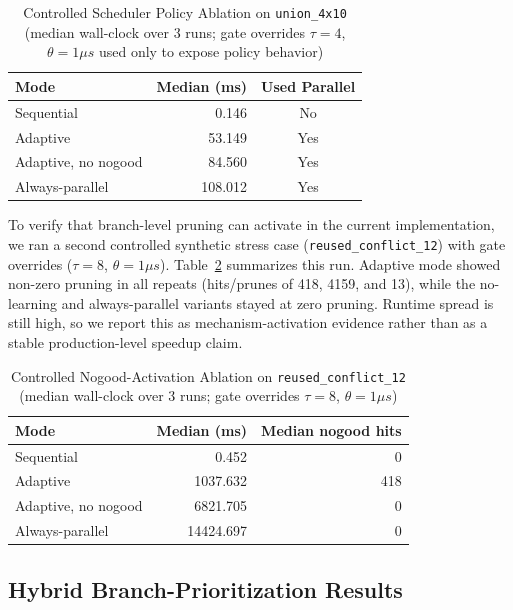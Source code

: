 \documentclass[preprint,12pt,times]{elsarticle}
\begin{document}
\begin{table}[htbp]
\centering
\caption{Controlled Scheduler Policy Ablation on \texttt{union\_4x10} (median wall-clock over 3 runs; gate overrides $\tau=4$, $\theta=1\mu s$ used only to expose policy behavior)}
\label{tab:scheduler-ablation}
\begin{tabular}{l|r|c}
\toprule
\textbf{Mode} & \textbf{Median (ms)} & \textbf{Used Parallel} \\
\midrule
Sequential & 0.146 & No \\
Adaptive & 53.149 & Yes \\
Adaptive, no nogood & 84.560 & Yes \\
Always-parallel & 108.012 & Yes \\
\bottomrule
\end{tabular}
\end{table}

To verify that branch-level pruning can activate in the current implementation, we ran a second controlled synthetic stress case (\texttt{reused\_conflict\_12}) with gate overrides ($\tau=8$, $\theta=1\mu s$). Table~\ref{tab:nogood-activation} summarizes this run. Adaptive mode showed non-zero pruning in all repeats (hits/prunes of 418, 4159, and 13), while the no-learning and always-parallel variants stayed at zero pruning. Runtime spread is still high, so we report this as mechanism-activation evidence rather than as a stable production-level speedup claim.

\begin{table}[htbp]
\centering
\caption{Controlled Nogood-Activation Ablation on \texttt{reused\_conflict\_12} (median wall-clock over 3 runs; gate overrides $\tau=8$, $\theta=1\mu s$)}
\label{tab:nogood-activation}
\begin{tabular}{l|r|r}
\toprule
\textbf{Mode} & \textbf{Median (ms)} & \textbf{Median nogood hits} \\
\midrule
Sequential & 0.452 & 0 \\
Adaptive & 1037.632 & 418 \\
Adaptive, no nogood & 6821.705 & 0 \\
Always-parallel & 14424.697 & 0 \\
\bottomrule
\end{tabular}
\end{table}

\subsection{Hybrid Branch-Prioritization Results}
\label{sec:hybrid-results}
\end{document}
